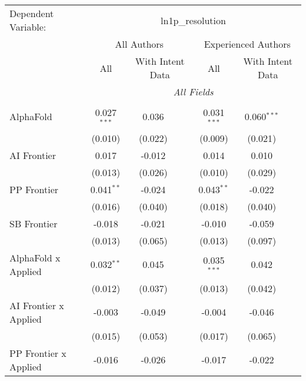 \begingroup
\centering
\begin{tabular}{lcccccc}
   \tabularnewline \midrule \midrule
   Dependent Variable: & \multicolumn{6}{c}{ln1p\_resolution}\\
 & \multicolumn{3}{c}{All Authors} & \multicolumn{3}{c}{Experienced Authors} \\
\cmidrule(lr){2-4} \cmidrule(lr){5-7}
 & \multicolumn{1}{c}{All} & \multicolumn{2}{c}{With Intent Data} & \multicolumn{1}{c}{All} & \multicolumn{2}{c}{With Intent Data} \\
\cmidrule(lr){2-2} \cmidrule(lr){3-4} \cmidrule(lr){5-5} \cmidrule(lr){6-7}
 & \multicolumn{6}{c}{\textit{All Fields}} \\ \\
   AlphaFold                      & 0.027$^{***}$ & 0.036   &         & 0.031$^{***}$ & 0.060$^{***}$ &   \\   
                                  & (0.010)       & (0.022) &         & (0.009)       & (0.021)       &   \\   
   AI Frontier                    & 0.017         & -0.012  &         & 0.014         & 0.010         &   \\   
                                  & (0.013)       & (0.026) &         & (0.010)       & (0.029)       &   \\   
   PP Frontier                    & 0.041$^{**}$  & -0.024  &         & 0.043$^{**}$  & -0.022        &   \\   
                                  & (0.016)       & (0.040) &         & (0.018)       & (0.040)       &   \\   
   SB Frontier                    & -0.018        & -0.021  &         & -0.010        & -0.059        &   \\   
                                  & (0.013)       & (0.065) &         & (0.013)       & (0.097)       &   \\   
   AlphaFold x Applied            & 0.032$^{**}$  & 0.045   &         & 0.035$^{***}$ & 0.042         &   \\   
                                  & (0.012)       & (0.037) &         & (0.013)       & (0.042)       &   \\   
   AI Frontier x Applied          & -0.003        & -0.049  &         & -0.004        & -0.046        &   \\   
                                  & (0.015)       & (0.053) &         & (0.017)       & (0.065)       &   \\   
   PP Frontier x Applied          & -0.016        & -0.026  &         & -0.017        & -0.022        &   \\   

\end{tabular}
